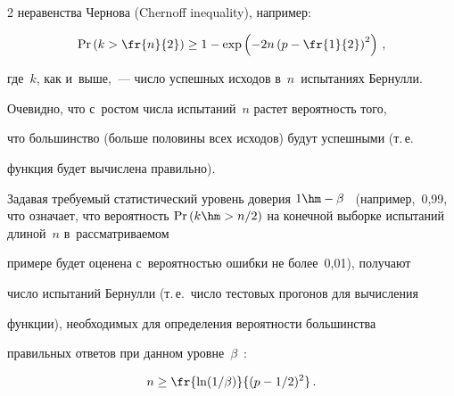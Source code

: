 \begin{multicols}{2}
неравенства Чернова (Chernoff inequality), например:





\noindent


    \begin{equation}


    \mathrm{Pr}\left( k>\fr{n}{2}\right) \geq 1-\exp \left( -2n\left( p-


\fr{1}{2}\right)^2\right)\,,


    \label{e4-bf}


    \end{equation}


где~$k$, как и~выше,~--- число успешных исходов в~$n$~испытаниях Бернулли.





    Очевидно, что с~ростом числа испытаний~$n$ растет вероятность того, 


что большинство (больше половины всех исходов) будут успешными (т.\,е.\ 


функция будет вычислена правильно).


    


    Задавая требуемый статистический уровень доверия $1\hm-


\beta$~\cite{13-bf} (например,~0,99, что означает, что вероятность $\mathrm{Pr}\,(k\hm> 


n/2)$ на конечной выборке испытаний длиной~$n$ в~рассматриваемом 


примере будет оценена с~вероятностью ошибки не более~0,01), получают 


число испытаний Бернулли (т.\,е.\ число тестовых прогонов для вычисления 


функции), необходимых для определения вероятности большинства 


правильных ответов при данном уровне~$\beta$~\cite{12-bf, 19-bf}:





\noindent


    \begin{equation}


    n\geq  \fr{\ln(1/\beta)}{(p-1/2)^2}\,.


    \label{e5-bf}


    \end{equation}


    



\end{multicols}
